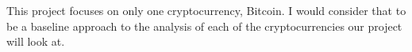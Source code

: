 \documentclass[
  coursecode={CMPE 351},
  assignmentname={Paper Review},
  studentnumber=20053722,
  name={Bryan Hoang (16bch1)},
  draft,
  final,
]{
  ltxanswer%
}
\begin{document}
\begin{questions}
\begin{solution}
      This project focuses on only one cryptocurrency, Bitcoin. I would consider that to be a baseline approach to the analysis of each of the cryptocurrencies our project will look at.
    \end{solution}

    \question{}
    \begin{solution}

    \end{solution}

    \question{}
    \begin{solution}

    \end{solution}
  \end{questions}

  \newpage

  \printbibliography[]
\end{document}

